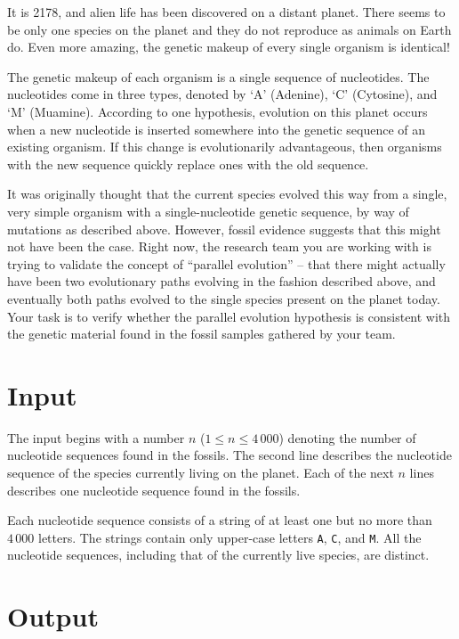 

It is 2178, and alien life has been discovered on a distant planet. There seems to be only one
species on the planet and they do not reproduce as animals on Earth do.  Even more amazing, the genetic makeup of every single organism is identical!

The genetic makeup of each organism is a single sequence of nucleotides. The
nucleotides come in three types, denoted by `A' (Adenine), `C' (Cytosine), and `M' (Muamine).
According to one hypothesis,
evolution on this planet occurs when a new nucleotide is inserted somewhere into the genetic
sequence of an existing organism.  If this change is evolutionarily advantageous, then organisms
with the new sequence quickly replace ones with the old sequence.

It was originally thought that the current species evolved this way from a single, very simple
organism with a single-nucleotide genetic sequence, by way of mutations as described above.
However, fossil evidence suggests that this might not have been the case. Right now, the research
team you are working with is trying to validate the concept of ``parallel evolution'' -- that there might actually have been two
evolutionary paths
evolving in the fashion described above, and eventually both paths evolved to the single species present on the planet today.  Your task is to 
 verify whether the parallel evolution hypothesis is consistent with the genetic material found in the fossil samples gathered by your team.


\section*{Input}

The input begins with a number $n$ ($1\le n\le 4\,000$) denoting the number of nucleotide sequences found
in the fossils. The second line describes the nucleotide sequence of the species currently living on the
planet. Each of the next $n$ lines describes one nucleotide sequence found in the fossils.

Each nucleotide sequence consists of a string of at least one but no more than
$4\,000$ letters. The strings contain only upper-case letters {\tt A}, {\tt C}, and {\tt M}.
All the nucleotide sequences, including that of the currently live species, are distinct.


\section*{Output}

